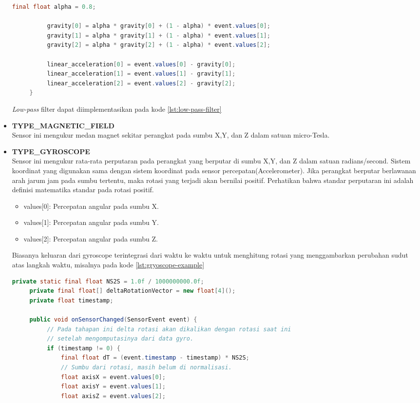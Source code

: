 \begin{itemize}
\begin{lstlisting}[caption={Implementasi \textit{low-pass} filter},label={lst:low-pass-filter},language=java]
          final float alpha = 0.8;

          gravity[0] = alpha * gravity[0] + (1 - alpha) * event.values[0];
          gravity[1] = alpha * gravity[1] + (1 - alpha) * event.values[1];
          gravity[2] = alpha * gravity[2] + (1 - alpha) * event.values[2];

          linear_acceleration[0] = event.values[0] - gravity[0];
          linear_acceleration[1] = event.values[1] - gravity[1];
          linear_acceleration[2] = event.values[2] - gravity[2];
     }
\end{lstlisting}
\textit{Low-pass} filter dapat diimplementasikan pada kode \ref{lst:low-pass-filter}\\
\item \textbf{TYPE\_MAGNETIC\_FIELD}\\
Sensor ini mengukur medan magnet sekitar perangkat pada sumbu X,Y, dan Z dalam satuan micro-Tesla.\\
\item \textbf{TYPE\_GYROSCOPE}\\
Sensor ini mengukur rata-rata perputaran pada perangkat yang berputar di sumbu X,Y, dan Z dalam satuan radians/second. Sistem koordinat yang digunakan sama dengan sistem koordinat pada sensor percepatan(Accelerometer). Jika perangkat berputar berlawanan arah jarum jam pada sumbu tertentu, maka rotasi yang terjadi akan bernilai positif. Perhatikan bahwa standar perputaran ini adalah definisi matematika standar pada rotasi positif.
\begin{itemize}
	\item values[0]: Percepatan angular pada sumbu X.
	\item values[1]: Percepatan angular pada sumbu Y.
	\item values[2]: Percepatan angular pada sumbu Z.
\end{itemize}
Biasanya keluaran dari gyroscope terintegrasi dari waktu ke waktu untuk menghitung rotasi yang menggambarkan perubahan sudut atas langkah waktu, misalnya pada kode \ref{lst:gryoscope-example}
\begin{lstlisting}[caption=contoh implementasi gyroscope,label={lst:gryoscope-example},language=java]
	  private static final float NS2S = 1.0f / 1000000000.0f;
     private final float[] deltaRotationVector = new float[4]();
     private float timestamp;

     public void onSensorChanged(SensorEvent event) {
          // Pada tahapan ini delta rotasi akan dikalikan dengan rotasi saat ini
          // setelah mengomputasinya dari data gyro.
          if (timestamp != 0) {
              final float dT = (event.timestamp - timestamp) * NS2S;
              // Sumbu dari rotasi, masih belum di normalisasi.
              float axisX = event.values[0];
              float axisY = event.values[1];
              float axisZ = event.values[2];


\end{lstlisting}
\end{itemize}
